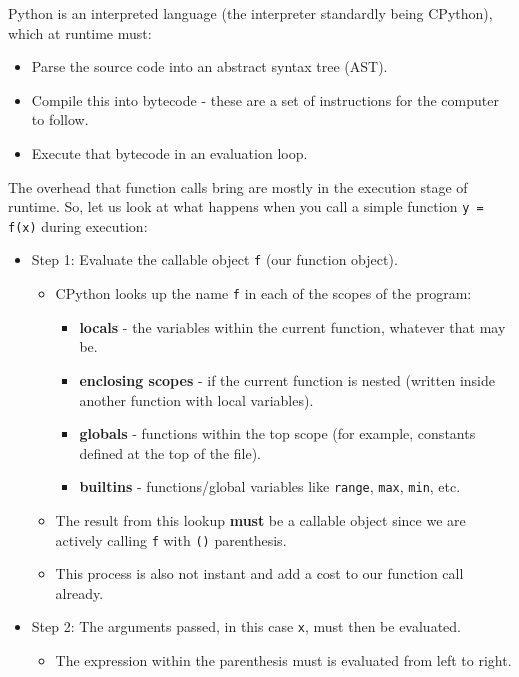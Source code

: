 \documentclass[10pt]{article}
\begin{document}
\begin{flushleft}
    Python is an interpreted language (the interpreter standardly being CPython), which at runtime must:
    \begin{itemize}
        \item Parse the source code into an abstract syntax tree (AST).
        \item Compile this into bytecode - these are a set of instructions for the computer to follow.
        \item Execute that bytecode in an evaluation loop.
    \end{itemize}
    The overhead that function calls bring are mostly in the execution stage of runtime.
    So, let us look at what happens when you call a simple function \verb|y = f(x)| during execution:
    \begin{itemize}
        \item Step 1: Evaluate the callable object \verb|f| (our function object).
        \begin{itemize}
            \item CPython looks up the name \verb|f| in each of the scopes of the program:
            \begin{itemize}
                \item \textbf{locals} - the variables within the current function, whatever that may be.
                \item \textbf{enclosing scopes} - if the current function is nested (written inside another function with local variables).
                \item \textbf{globals} - functions within the top scope (for example, constants defined at the top of the file).
                \item \textbf{builtins} - functions/global variables like \verb|range|, \verb|max|, \verb|min|, etc.
            \end{itemize}
            \item The result from this lookup \textbf{must} be a callable object since we are actively calling \verb|f| with \verb|()| parenthesis.
            \item This process is also not instant and add a cost to our function call already.
        \end{itemize}
        \item Step 2: The arguments passed, in this case \verb|x|, must then be evaluated.
        \begin{itemize}
            \item The expression within the parenthesis must is evaluated from left to right.

\end{itemize}
\end{itemize}
\end{flushleft}
\end{document}

